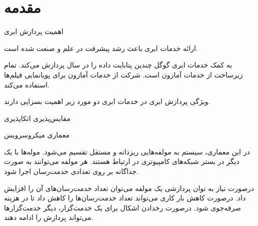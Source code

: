 \section{مقدمه}


\begin{frame}{اهمیت پردازش ابری}

ارائه خدمات ابری باعث رشد پیشرفت در علم و صنعت شده است.

\begin{itemize}\RTList
{}  به کمک خدمات ابری گوگل چندین پتابایت داده را در سال پردازش می‌کند.
 تمام زیرساخت  از خدمات آمازون است.
 شرکت  از خدمات آمازون برای پویانمایی فیلم‌ها استفاده می‌کند.
\end{itemize}
\end{frame}

\begin{frame}{ویژگی پردازش ابری}
	در خدمات ابری دو مورد زیر اهمیت بسزایی دارند.
	\begin{itemize}\RTList
		 مقایس‌پذیری
		 اتکاپذیری
	\end{itemize}
	\pause
	\begin{center}
	\end{center}
\end{frame}

\begin{frame}{معماری میکروسرویس}
	\begin{itemize}\RTList
	 در این معماری، سیستم به مولفه‌هایی ریزدانه‌ و مستقل تقسیم می‌شود.
	 موله‌ها با یک دیگر در بستر شبکه‌های کامپیوتری در ارتباط هستند.
	 هر مولفه می‌توانند به صورت جداگانه بر روی تعدادی خدمت‌رسان اجرا شود.
	
	\pause
	\begin{itemize}\RTList
		 درصورت نیاز به توان پردازشی یک مولفه می‌توان تعداد خدمت‌رسان‌های آن را افزایش داد.
		 درصورت کاهش بار کاری می‌تواند تعداد خدمت‌رسان‌ها را کاهش داد تا در هزینه صرفه‌جوی شود.
		 درصورت رخدادن اشکال برای یک خدمت‌گزار، دیگر خدمت‌گزار‌ها می‌تواند پردازش را ادامه دهند.
	\end{itemize}
	\end{itemize}
\end{frame}

